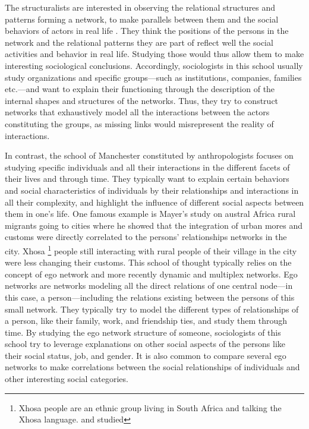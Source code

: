 The structuralists are interested in observing the relational structures and patterns forming a network, to make parallels between them and the social behaviors of actors in real life \cite{lazegaReseaux}.
They think the positions of the persons in the network and the relational patterns they are part of reflect well the social activities and behavior in real life.
Studying those would thus allow them to make interesting sociological conclusions.
Accordingly, sociologists in this school usually study organizations and specific groups---such as institutions, companies, families etc.---and want to explain their functioning through the description of the internal shapes and structures of the networks.
Thus, they try to construct networks that exhaustively model all the interactions between the actors constituting the groups, as missing links would misrepresent the reality of interactions.

In contrast, the school of Manchester constituted by anthropologists focuses on studying specific individuals and all their interactions in the different facets of their lives and through time.
They typically want to explain certain behaviors and social characteristics of individuals by their relationships and interactions in all their complexity, and highlight the influence of different social aspects between them in one's life.
One famous example is Mayer's study on austral Africa rural migrants going to cities \cite{mayerMigrancyStudyAfricans1962} where he showed that the integration of urban mores and customs were directly correlated to the persons' relationships networks in the city.
Xhosa \footnote{Xhosa people are an ethnic group living in South Africa and talking the Xhosa language. and studied} people still interacting with rural people of their village in the city were less changing their customs.
This school of thought typically relies on the concept of ego network and more recently dynamic and multiplex networks.
Ego networks are networks modeling all the direct relations of one central node---in this case, a person---including the relations existing between the persons of this small network.
They typically try to model the different types of relationships of a person, like their family, work, and friendship ties, and study them through time.
By studying the ego network structure of someone, sociologists of this school try to leverage explanations on other social aspects of the persons like their social status, job, and gender.
It is also common to compare several ego networks to make correlations between the social relationships of individuals and other interesting social categories.

